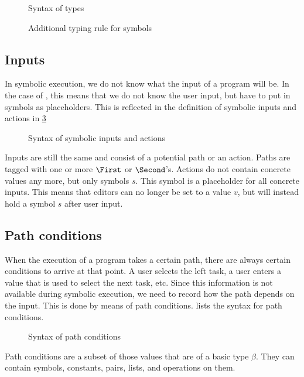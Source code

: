 \begin{figure}[h]
  \small
  \caption{Syntax of \TOPHAT types}
  \label{fig:syntaxtypes}
\end{figure}

\begin{figure}[h]
  \small
  \caption{Additional typing rule for symbols}
  \label{fig:typingsymbol}
\end{figure}



\subsection{Inputs}

In symbolic execution, we do not know what the input of a program will be.
In the case of \TOPHAT, this means that we do not know the user input, but have to put in symbols as placeholders.
This is reflected in the definition of symbolic inputs and actions in \cref{fig:syntaxinputs}

\begin{figure}[h]
  \small
  \caption{Syntax of symbolic inputs and actions}
  \label{fig:syntaxinputs}
\end{figure}

Inputs are still the same and consist of a potential path or an action.
Paths are tagged with one or more $\First$ or $\Second$'s.
Actions do not contain concrete values any more, but only symbols $s$.
This symbol is a placeholder for all concrete inputs.
This means that editors can no longer be set to a value $v$, but will instead hold a symbol $s$ after user input.



\subsection{Path conditions}

When the execution of a \TOPHAT program takes a certain path, there are always certain conditions to arrive at that point.
A user selects the left task, a user enters a value that is used to select the next task, etc.
Since this information is not available during symbolic execution, we need to record how the path depends on the input.
This is done by means of path conditions.
 lists the syntax for path conditions.

\begin{figure}[h]
  \small
  \caption{Syntax of path conditions}
  \label{fig:syntaxpredicates}
\end{figure}

Path conditions are a subset of those values that are of a basic type $\beta$.
They can contain symbols, constants, pairs, lists, and operations on them.
